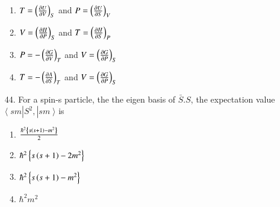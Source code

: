 \documentclass[journal,12pt,onecolumn]{IEEEtran}
\theoremstyle{remark}
\begin{document}
\begin{enumerate}
            \hfill{}
            \begin{enumerate}
                \item $T = \left(\frac{\partial U}{\partial V}\right)_S$ and  $P = \left(\frac{\partial U}{\partial S}\right)_V$
                \item $V = \left(\frac{\partial H}{\partial P}\right)_S$ and  $T = \left(\frac{\partial H}{\partial S}\right)_P$
                \item $P = -\left(\frac{\partial G}{\partial V}\right)_T$ and  $V = \left(\frac{\partial G}{\partial P}\right)_S$
                \item $T = -\left(\frac{\partial A}{\partial S}\right)_T$ and  $V = \left(\frac{\partial G}{\partial P}\right)_S$
            \end{enumerate}

        \item[44.] For a spin-s particle, the the eigen basis of $\bar{S}.S$, the expectation value
            $\langle \; sm|S^2,|sm \; \rangle$ is

            \hfill{}
            \begin{enumerate}
                \item $\frac{\hbar ^ 2 \left\{s\left(s + 1\right) - m^2\right\}}{2}$
                \item $\hbar ^ 2 \left\{s\left(s + 1\right) - 2m^2\right\}$
                \item $\hbar ^ 2 \left\{s\left(s + 1\right) - m^2\right\}$
                \item $\hbar ^2 m^2$
            \end{enumerate}


\end{enumerate}
\end{document}
